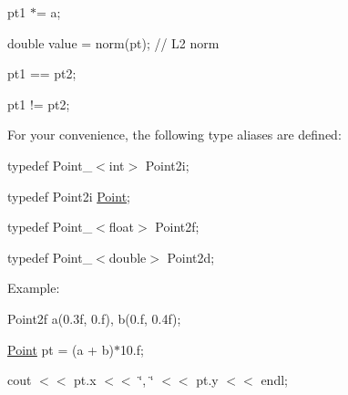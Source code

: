 {\ttfamily }

{\ttfamily }

{\ttfamily pt1 $\ast$= a;}

{\ttfamily }

{\ttfamily }

{\ttfamily double value = norm(pt); // L2 norm}

{\ttfamily }

{\ttfamily }

{\ttfamily pt1 == pt2;}

{\ttfamily }

{\ttfamily }

{\ttfamily pt1 != pt2;}

{\ttfamily }

{\ttfamily }

{\ttfamily For your convenience, the following type aliases are defined\+:}

{\ttfamily }

{\ttfamily }

{\ttfamily typedef Point\+\_\+$<$int$>$ Point2i;}

{\ttfamily }

{\ttfamily }

{\ttfamily typedef Point2i \mbox{\hyperlink{classorg_1_1opencv_1_1core_1_1_point}{Point}};}

{\ttfamily }

{\ttfamily }

{\ttfamily typedef Point\+\_\+$<$float$>$ Point2f;}

{\ttfamily }

{\ttfamily }

{\ttfamily typedef Point\+\_\+$<$double$>$ Point2d;}

{\ttfamily }

{\ttfamily }

{\ttfamily Example\+:}

{\ttfamily }

{\ttfamily }

{\ttfamily Point2f a(0.\+3f, 0.\+f), b(0.\+f, 0.\+4f);}

{\ttfamily }

{\ttfamily }

{\ttfamily \mbox{\hyperlink{classorg_1_1opencv_1_1core_1_1_point}{Point}} pt = (a + b)$\ast$10.f;}

{\ttfamily }

{\ttfamily }

{\ttfamily cout $<$$<$ pt.\+x $<$$<$ \char`\"{}, \char`\"{} $<$$<$ pt.\+y $<$$<$ endl;}

